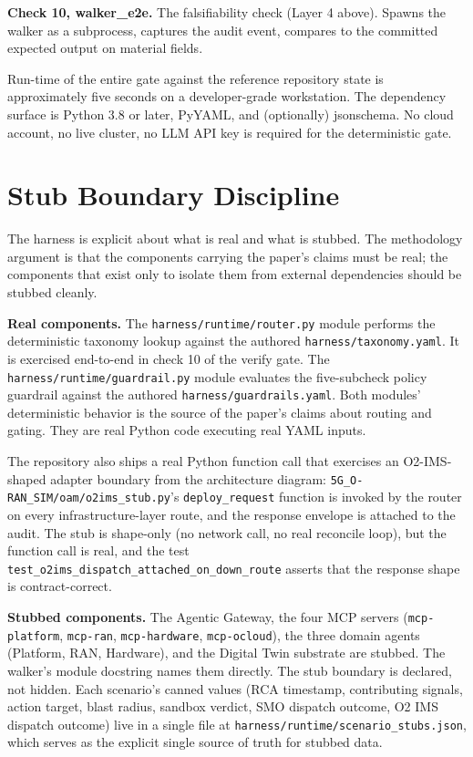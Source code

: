 \documentclass[twocolumn,10pt,a4paper]{article}
\begin{document}
\textbf{Check 10, walker\_e2e.} The falsifiability check (Layer 4 above). Spawns the walker as a subprocess, captures the audit event, compares to the committed expected output on material fields.

Run-time of the entire gate against the reference repository state is approximately five seconds on a developer-grade workstation. The dependency surface is Python 3.8 or later, PyYAML, and (optionally) jsonschema. No cloud account, no live cluster, no LLM API key is required for the deterministic gate.

\section{Stub Boundary Discipline}
\label{sec:stub}

The harness is explicit about what is real and what is stubbed. The methodology argument is that the components carrying the paper's claims must be real; the components that exist only to isolate them from external dependencies should be stubbed cleanly.

\textbf{Real components.} The \texttt{harness/runtime/router.py} module performs the deterministic taxonomy lookup against the authored \texttt{harness/taxonomy.yaml}. It is exercised end-to-end in check 10 of the verify gate. The \texttt{harness/runtime/guardrail.py} module evaluates the five-subcheck policy guardrail against the authored \texttt{harness/guardrails.yaml}. Both modules' deterministic behavior is the source of the paper's claims about routing and gating. They are real Python code executing real YAML inputs.

The repository also ships a real Python function call that exercises an O2-IMS-shaped adapter boundary from the architecture diagram: \texttt{5G\_O-RAN\_SIM/oam/o2ims\_stub.py}'s \texttt{deploy\_request} function is invoked by the router on every infrastructure-layer route, and the response envelope is attached to the audit. The stub is shape-only (no network call, no real reconcile loop), but the function call is real, and the test \texttt{test\_o2ims\_dispatch\_attached\_on\_down\_route} asserts that the response shape is contract-correct.

\textbf{Stubbed components.} The Agentic Gateway, the four MCP servers (\texttt{mcp-platform}, \texttt{mcp-ran}, \texttt{mcp-hardware}, \texttt{mcp-ocloud}), the three domain agents (Platform, RAN, Hardware), and the Digital Twin substrate are stubbed. The walker's module docstring names them directly. The stub boundary is declared, not hidden. Each scenario's canned values (RCA timestamp, contributing signals, action target, blast radius, sandbox verdict, SMO dispatch outcome, O2 IMS dispatch outcome) live in a single file at \texttt{harness/runtime/scenario\_stubs.json}, which serves as the explicit single source of truth for stubbed data.
\end{document}
